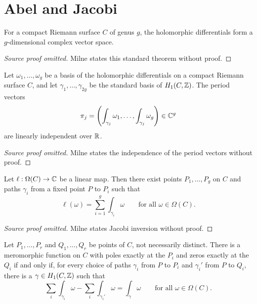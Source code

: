 \section{Abel and Jacobi}
\begin{theorem}\label{thm:milne-holomorphic-differentials}
For a compact Riemann surface $C$ of genus $g$, the holomorphic differentials form a $g$-dimensional complex vector space.
\end{theorem}
\begin{proof}[Source proof omitted]
Milne states this standard theorem without proof.
\end{proof}
\begin{theorem}\label{thm:milne-period-independence}
Let $\omega_1,\ldots,\omega_g$ be a basis of the holomorphic differentials
on a compact Riemann surface $C$, and let $\gamma_1,\ldots,\gamma_{2g}$ be
the standard basis of $H_1(C,\mathbb{Z})$.  The period vectors
\[
\pi_j=\left(\int_{\gamma_j}\omega_1,\ldots,
\int_{\gamma_j}\omega_g\right)\in\mathbb{C}^g
\]
are linearly independent over $\mathbb{R}$.
\end{theorem}
\begin{proof}[Source proof omitted]
Milne states the independence of the period vectors without proof.
\end{proof}
\begin{theorem}\label{thm:milne-jacobi-inversion}
Let $\ell:\Omega(C)\to\mathbb{C}$ be a linear map.  Then there exist points
$P_1,\ldots,P_g$ on $C$ and paths $\gamma_i$ from a fixed point $P$ to
$P_i$ such that
\[
\ell(\omega)=\sum_{i=1}^g\int_{\gamma_i}\omega
\qquad\text{for all }\omega\in\Omega(C).
\]
\end{theorem}
\begin{proof}[Source proof omitted]
Milne states Jacobi inversion without proof.
\end{proof}
\begin{theorem}\label{thm:milne-abel-theorem}
Let $P_1,\ldots,P_r$ and $Q_1,\ldots,Q_r$ be points of $C$, not
necessarily distinct.  There is a meromorphic function on $C$ with poles
exactly at the $P_i$ and zeros exactly at the $Q_i$ if and only if, for every
choice of paths $\gamma_i$ from $P$ to $P_i$ and $\gamma_i'$ from $P$ to
$Q_i$, there is a $\gamma\in H_1(C,\mathbb{Z})$ such that
\[
\sum_i\int_{\gamma_i}\omega-\sum_i\int_{\gamma_i'}\omega
 =\int_{\gamma}\omega
\qquad\text{for all }\omega\in\Omega(C).
\]
\end{theorem}
